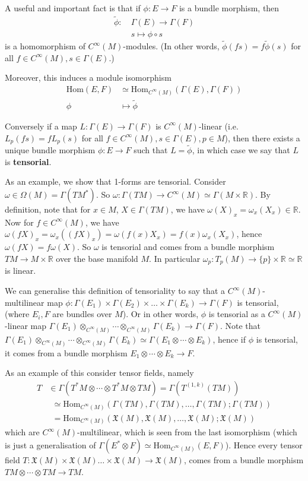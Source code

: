 \documentclass[a4paper]{article}
\theoremstyle{definition} \newtheorem*{definition}{Definition}
\theoremstyle{definition} \newtheorem*{definitions}{Definitions}
\theoremstyle{plain} \newtheorem{theorem}{Theorem}[section]
\theoremstyle{plain} \newtheorem{proposition}[theorem]{Proposition}
\theoremstyle{plain} \newtheorem{corollary}[theorem]{Corollary}
\theoremstyle{plain} \newtheorem{lemma}[theorem]{Lemma}
\theoremstyle{plain} \newtheorem{example}[theorem]{Example}
\newcommand{\defn}[1]{\textbf{#1}}
\newcommand{\realnos}{\mathbb{R}}
\newcommand{\Hom}{\text{Hom}}
\newcommand{\smooth}{C^\infty}
\begin{document}
A useful and important fact is that if $\phi:E\to F$ is a bundle morphism, then 
\begin{align*}
\tilde{\phi}:\ & \Gamma(E)\to \Gamma(F) \\
& s \mapsto \phi \circ s
\end{align*}
is a homomorphism of $C^\infty(M)$-modules. (In other words, $\tilde{\phi}(fs)=f\tilde{\phi}(s)$ for all $f\in C^\infty (M), s\in \Gamma(E)$.)

Moreover, this induces a module isomorphism 
\begin{align*}
\text{Hom}(E, F) & \simeq \text{Hom}_{C^\infty (M)}(\Gamma(E), \Gamma(F)) \\
\phi & \mapsto \tilde{\phi} 
\end{align*}

Conversely if a map $L:\Gamma(E)\to \Gamma(F)$ is $C^\infty(M)$-linear (i.e. $L_p(fs)=fL_p(s)$ for all $f\in C^\infty (M), s\in \Gamma(E), p\in M$), then there exists a unique bundle morphism $\phi:E\to F$ such that $L=\tilde{\phi}$, in which case we say that $L$ is \defn{tensorial}. 

As an example, we show that 1-forms are tensorial. Consider $\omega\in \Omega(M) = \Gamma(TM^*)$. So $\omega:\Gamma(TM)\to \smooth (M)\simeq \Gamma(M\times \realnos)$. By definition, note that for $x\in M$, $X\in \Gamma(TM)$, we have $\omega(X)_x = \omega_x(X_x)\in \realnos$. Now for $f\in \smooth(M)$, we have $\omega(fX)_x = \omega_x((fX)_x)= \omega(f(x)X_x) = f(x)\omega_x(X_x)$, hence $\omega(fX)=f \omega(X)$. So $\omega$ is tensorial and comes from a bundle morphism $TM\to M\times \realnos$ over the base manifold $M$. In particular $\omega_p:T_p(M)\to \{p\} \times \realnos \simeq \realnos$ is linear.  

We can generalise this definition of tensoriality to say that a $\smooth(M)$-multilinear map $\phi:\Gamma(E_1)\times \Gamma(E_2)\times \ldots \times \Gamma(E_k)\to \Gamma(F)$ is tensorial, (where $E_i, F$ are bundles over $M$). Or in other words, $\phi$ is tensorial as a $\smooth(M)$-linear map $\Gamma(E_1)\otimes_{\smooth(M)} \cdots \otimes_{\smooth(M)} \Gamma(E_k)\to \Gamma(F)$. Note that $\Gamma(E_1)\otimes_{\smooth(M)} \cdots \otimes_{\smooth(M)} \Gamma(E_k)\simeq \Gamma(E_1\otimes \cdots \otimes E_k)$, hence if $\phi$ is tensorial, it comes from a bundle morphism $E_1\otimes \cdots \otimes E_k\to F$.

As an example of this consider tensor fields, namely 
\begin{align*}
T & \in \Gamma(T^*M\otimes \cdots \otimes T^*M \otimes TM) = \Gamma(T^{(1, k)}(TM)) \\
& \ \ \simeq \text{Hom}_{\smooth(M)}(\Gamma(TM), \Gamma(TM), \ldots, \Gamma(TM); \Gamma(TM)) \\
& \ \ = \text{Hom}_{\smooth(M)}(\mathfrak{X}(M), \mathfrak{X}(M), \ldots, \mathfrak{X}(M); \mathfrak{X}(M))
\end{align*}
which are $\smooth(M)$-multilinear, which is seen from the last isomorphism (which is just a generalisation of $\Gamma(E^*\otimes F)\simeq \Hom_{\smooth (M)}(E, F)$). Hence every tensor field  $T:\mathfrak{X}(M)\times \mathfrak{X}(M) \ldots \times \mathfrak{X}(M)\to \mathfrak{X}(M)$, comes from a bundle morphism $TM\otimes \cdots \otimes TM\to TM$.
\end{document}
